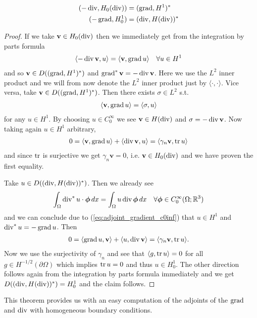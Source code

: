 \documentclass[../master_thesis.tex]{subfiles}
\begin{document}
\begin{theorem}\label{thm:adjoints_grad_div_without_bc}
    \begin{align}
        (-\operatorname{div}, H_0(\operatorname{div})) &= (\operatorname{grad}, H^1)^* \\
        (-\operatorname{grad}, H_0^1) &= (\operatorname{div}, H(\operatorname{div}))^*
    \end{align}
\end{theorem}
\begin{proof}
    If we take $\mathbf{v} \in H_0(\operatorname{div})$ then we immediately get 
    from the integration by parts formula
    \begin{align*}
        \langle -\operatorname{div} \mathbf{v}, u \rangle = \langle \mathbf{v}, \operatorname{grad} u \rangle \quad \forall u \in H^1
    \end{align*}
    and so $\mathbf{v} \in D((\operatorname{grad}, H^1)^*)$ and $\operatorname{grad}^* \mathbf{v} = -\operatorname{div} \mathbf{v}$.
    Here we use the $L^2$ inner product and we will from now denote the $L^2$ inner 
    product just by $\langle \cdot , \cdot \rangle$.
    Vice versa, take $\mathbf{v} \in D((\operatorname{grad}, H^1)^*)$. Then there exists 
    $\sigma \in L^2$ s.t.
    \begin{align*}
        \langle \mathbf{v}, \operatorname{grad} u\rangle = \langle \sigma, u \rangle
    \end{align*}
    for any $u \in H^1$. By choosing $u \in C_0^\infty$ we see 
    $\mathbf{v} \in H(\operatorname{div})$ and $\sigma = -\operatorname{div} \mathbf{v}$. 
    Now taking again $u \in H^1$ arbitrary,
    \begin{align*}
        0 = \langle \mathbf{v}, \operatorname{grad} u \rangle + \langle \operatorname{div} \mathbf{v}, u \rangle
        = \langle \gamma_n \mathbf{v}, \operatorname{tr} u \rangle
    \end{align*}
    and since $\operatorname{tr}$ is surjective we get $\gamma_n \mathbf{v} = 0$, i.e. 
    $\mathbf{v} \in H_0(\operatorname{div})$ and we have proven the first equality.

    Take $u \in D((\operatorname{div}, H(\operatorname{div}))^*)$. Then we already see
    \begin{align*}
        \int_\Omega \operatorname{div}^*u \cdot \bm{\phi} \, dx
        = \int_\Omega u \operatorname{div} \bm{\phi} \, dx \quad \forall \bm{\phi} \in C_0^\infty(\Omega;\mathbb{R}^3)
    \end{align*}
    and we can conclude due to (\ref{eq:adjoint_gradient_c0inf}) that $u \in H^1$ and
    $\operatorname{div}^*u = -\operatorname{grad} u$. Then 
    \begin{align*}
        0 = \langle \operatorname{grad} u, \mathbf{v} \rangle
            + \langle u, \operatorname{div} \mathbf{v} \rangle
        = \langle \gamma_n \mathbf{v}, \operatorname{tr} u \rangle.
    \end{align*}
    Now we use the surjectivity of $\gamma_n$ and see that 
    $\langle g, \operatorname{tr} u \rangle = 0$ for all $g \in H^{-1/2}(\partial \Omega)$ which 
    implies $\operatorname{tr} u = 0$ and thus $u \in H^1_0$. The other direction follows again 
    from the integration by parts formula immediately and we get 
    $D((\operatorname{div}, H(\operatorname{div}))^*) = H^1_0$ and the claim follows.
\end{proof}
This theorem provides us with an easy computation of the adjoints 
of the $\operatorname{grad}$ and $\operatorname{div}$ with homogeneous boundary conditions.
\end{document}
